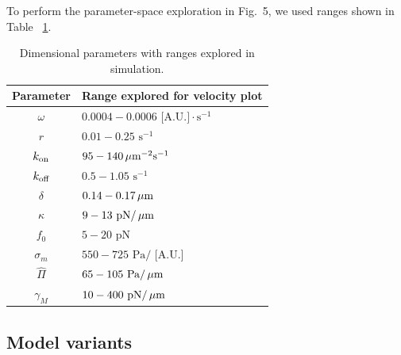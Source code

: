 To perform the parameter-space exploration in Fig.~5, we used ranges shown in Table ~\ref{tab:parameterranges}. 
\begin{table}[h!]
\caption{Dimensional parameters with ranges explored in simulation.}\centering \label{tab:parameterranges} 
\begin{tabular}{cl}
\hline
{Parameter} & {Range explored for velocity plot}\\
\hline
$\omega$   &  $0.0004-0.0006 \text{ [A.U.]} \cdot \text{s}^{-1}$ \\
$r$  & $0.01-0.25 \text{ s}^{-1}$ \\
$k_{\mbox{\scriptsize on}}$  & $95-140  \,\mu\mbox{m}^{-2}\text{s}^{-1}$\\
$k_{\mbox{\scriptsize off}}$ & $0.5-1.05 \text{ s}^{-1}$\\
$\delta$ &  $0.14-0.17  \,\mu\mbox{m}$\\
$\kappa$ & $9-13 \text{ pN/$\,\mu\mbox{m}$}$\\
$f_0$ & $5-20 \text{ pN}$ \\
$\sigma_m$  & $550-725\text{ Pa/ [A.U.]}$\\
$\hat{\Pi}$ & $65-105\text{  Pa/$\,\mu\mbox{m}$}$\\
$\gamma_M$ & $10-400 \text{ pN/$\,\mu\mbox{m}$}$\\
\hline
\end{tabular} 
\end{table}
\subsection{Model variants}

%
%
%

